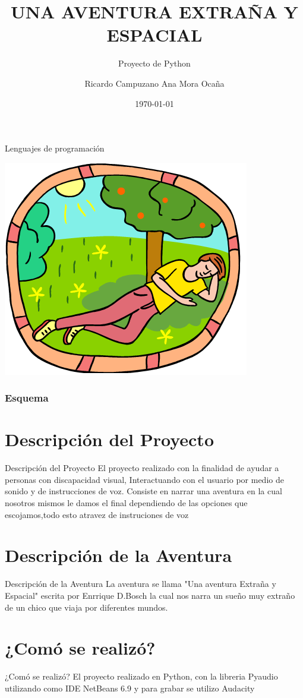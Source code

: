 \documentclass[utf8]{beamer}
\title{UNA AVENTURA EXTRAÑA Y ESPACIAL}
\subtitle {Proyecto de Python}
\author{ Ricardo Campuzano  Ana Mora Ocaña}
\date{\today}
\institute {ESPOL}
\begin{document}
\begin{frame}[plain]{Lenguajes de programación}
\begin{center}
\includegraphics [width = 0.3 \textwidth]{logo.png} %
\end{center}
\titlepage
\end{frame}

\begin{frame}
\frametitle{Esquema} %
\tableofcontents[pausesections]
\end{frame}

\section{Descripción del Proyecto}
\begin{frame}[allowframebreaks]

\begin{block}{Descripción del Proyecto }
El proyecto realizado con la finalidad de ayudar a personas con discapacidad visual, Interactuando con el usuario por medio de sonido y de instrucciones de voz.
 Consiste en narrar una aventura en la cual nosotros mismos le damos el final dependiendo de las opciones que escojamos,todo esto atravez de instruciones de voz
\end {block}
\end{frame}
\section{Descripción de la Aventura}
\begin{frame}[allowframebreaks]

\begin{block}{Descripción de la Aventura }
La aventura se llama "Una aventura Extraña y Espacial" escrita por Enrrique D.Bosch la cual nos narra un sueño muy extraño de un chico que viaja por diferentes mundos.
\end {block}
\end{frame}

\section{¿Comó se realizó?}
\begin{frame}[allowframebreaks]
\begin{block}{¿Comó se realizó? }
El proyecto realizado en Python, con la libreria Pyaudio utilizando como IDE NetBeans 6.9 y para grabar se utilizo Audacity 
\end {block}
\end{frame}
\end{document}
